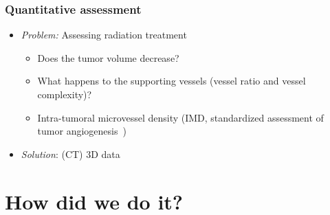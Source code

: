 \documentclass[]{beamer}
\newcommand{\uct}{\si{\micro}CT\xspace} %
\begin{document}
\begin{frame}
	\frametitle{Quantitative assessment}
	\begin{itemize}
		\item \emph{Problem:} Assessing radiation treatment
		\begin{itemize}
			\item Does the tumor volume decrease?
			\item What happens to the supporting vessels (vessel ratio and vessel complexity)?
			\item Intra-tumoral microvessel density (IMD, standardized assessment of tumor angiogenesis~\cite{Hasan2002})
		\end{itemize}
		\pause
		\item \emph{Solution}: (\uct) 3D data
	\end{itemize}
\end{frame}

\section{How did we do it?}
\end{document}
